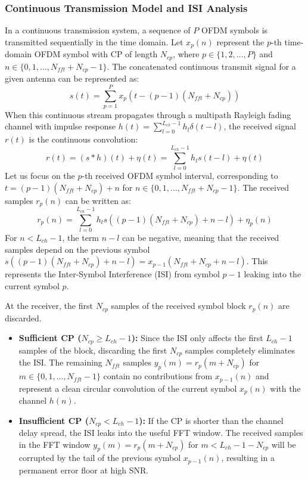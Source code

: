 \documentclass[a4paper]{article}
\begin{document}
\subsubsection{Continuous Transmission Model and ISI Analysis}
In a continuous transmission system, a sequence of $P$ OFDM symbols is transmitted sequentially in the time domain. Let $x_p(n)$ represent the $p$-th time-domain OFDM symbol with CP of length $N_{cp}$, where $p \in \{1, 2, \dots, P\}$ and $n \in \{0, 1, \dots, N_{fft} + N_{cp} - 1\}$. The concatenated continuous transmit signal for a given antenna can be represented as:
\begin{equation}
s(t) = \sum_{p=1}^{P} x_p(t - (p-1)(N_{fft} + N_{cp}))
\end{equation}
When this continuous stream propagates through a multipath Rayleigh fading channel with impulse response $h(t) = \sum_{l=0}^{L_{ch}-1} h_l \delta(t - l)$, the received signal $r(t)$ is the continuous convolution:
\begin{equation}
r(t) = (s * h)(t) + \eta(t) = \sum_{l=0}^{L_{ch}-1} h_l s(t - l) + \eta(t)
\end{equation}
Let us focus on the $p$-th received OFDM symbol interval, corresponding to $t = (p-1)(N_{fft} + N_{cp}) + n$ for $n \in \{0, 1, \dots, N_{fft} + N_{cp} - 1\}$. The received samples $r_p(n)$ can be written as:
\begin{equation}
r_p(n) = \sum_{l=0}^{L_{ch}-1} h_l s((p-1)(N_{fft} + N_{cp}) + n - l) + \eta_p(n)
\end{equation}
For $n < L_{ch} - 1$, the term $n - l$ can be negative, meaning that the received samples depend on the previous symbol $s((p-1)(N_{fft} + N_{cp}) + n - l) = x_{p-1}(N_{fft} + N_{cp} + n - l)$. This represents the Inter-Symbol Interference (ISI) from symbol $p-1$ leaking into the current symbol $p$.

At the receiver, the first $N_{cp}$ samples of the received symbol block $r_p(n)$ are discarded. 
\begin{itemize}
    \item \textbf{Sufficient CP ($N_{cp} \ge L_{ch} - 1$):} Since the ISI only affects the first $L_{ch} - 1$ samples of the block, discarding the first $N_{cp}$ samples completely eliminates the ISI. The remaining $N_{fft}$ samples $y_p(m) = r_p(m + N_{cp})$ for $m \in \{0, 1, \dots, N_{fft}-1\}$ contain no contributions from $x_{p-1}(n)$ and represent a clean circular convolution of the current symbol $x_p(n)$ with the channel $h(n)$.
    \item \textbf{Insufficient CP ($N_{cp} < L_{ch} - 1$):} If the CP is shorter than the channel delay spread, the ISI leaks into the useful FFT window. The received samples in the FFT window $y_p(m) = r_p(m + N_{cp})$ for $m < L_{ch} - 1 - N_{cp}$ will be corrupted by the tail of the previous symbol $x_{p-1}(n)$, resulting in a permanent error floor at high SNR.
\end{itemize}
\end{document}
